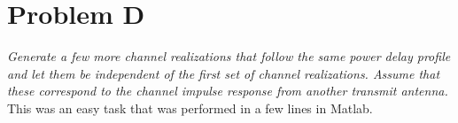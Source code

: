 \section{Problem D}
\textit{Generate a few more channel realizations that follow the same power delay profile and let them be independent of the first set of channel realizations. Assume that these correspond to the channel impulse response from another transmit antenna.}\\

This was an easy task that was performed in a few lines in Matlab.


